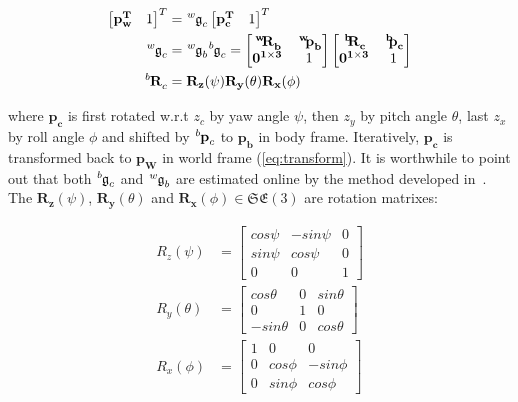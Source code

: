 \begin{equation}\label{eq:transform}
\begin{aligned}
\begin{bmatrix}\mathbf{p^T_w}&1\end{bmatrix}^T&=\tensor*[^w]{\mathfrak{g}}{_c}\begin{bmatrix}\mathbf{p^T_c}&1\end{bmatrix}^T\\
\tensor*[^w]{\mathfrak{g}}{_c}&=\tensor*[^w]{\mathfrak{g}}{_b}\tensor*[^b]{\mathfrak{g}}{_c}=\begin{bmatrix}\mathbf{\tensor*[^w]{R}{_b}}&\mathbf{\tensor*[^w]{p}{_b}}\\\mathbf{0^{1\times3}}&1\end{bmatrix}
\begin{bmatrix}\mathbf{\tensor*[^b]{R}{_c}}&\mathbf{\tensor*[^b]{p}{_c}}\\\mathbf{0^{1\times3}}&1\end{bmatrix}\\
\tensor*[^b]{\mathbf{R}}{_c}&=\mathbf{R_z}(\psi)\mathbf{R_y}(\theta)\mathbf{R_x}(\phi)
\end{aligned}
\end{equation}

\noindent
where $\mathbf{p_c}$ is first rotated w.r.t $z_c$ by yaw angle $\psi$, then $z_y$ by pitch angle $\theta$, last $z_x$ by roll angle $\phi$ and shifted by $\tensor*[^b]{\mathbf{p}}{_c}$ to $\mathbf{p_b}$ in body frame. Iteratively, $\mathbf{p_c}$ is transformed back to $\mathbf{p_W}$ in world frame (\ref{eq:transform}). It is worthwhile to point out that both $\tensor*[^b]{\mathfrak{g}}{_c}$ and $\tensor*[^w]{\mathfrak{g}}{_b}$ are estimated online by the method developed in~\cite{VINS}. The $\mathbf{R_z}(\psi)$, $\mathbf{R_y}(\theta)$ and $\mathbf{R_x}(\phi)\in\mathfrak{SE(3)}$ are rotation matrixes:

\begin{equation}\label{eq:rotation}
\begin{aligned}
R_z(\psi)&=\begin{bmatrix}cos\psi&-sin\psi&0\\sin\psi&cos\psi&0\\0&0&1\end{bmatrix}\\
R_y(\theta)&=\begin{bmatrix}cos\theta&0&sin\theta\\0&1&0\\-sin\theta&0&cos\theta\end{bmatrix}\\
R_x(\phi)&=\begin{bmatrix}1&0&0\\0&cos\phi&-sin\phi\\0&sin\phi&cos\phi\end{bmatrix}
\end{aligned}
\end{equation}

